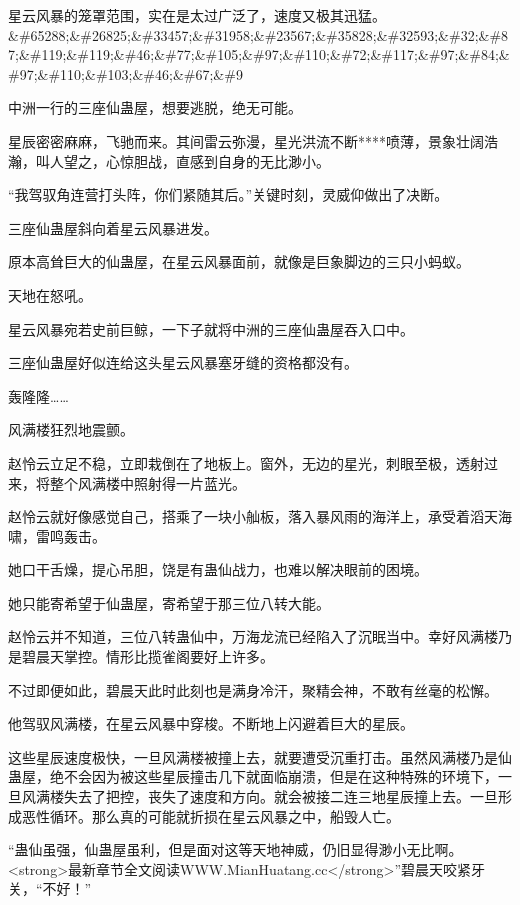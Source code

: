 
\begin{this_body}

星云风暴的笼罩范围，实在是太过广泛了，速度又极其迅猛。\&\#65288;\&\#26825;\&\#33457;\&\#31958;\&\#23567;\&\#35828;\&\#32593;\&\#32;\&\#87;\&\#119;\&\#119;\&\#46;\&\#77;\&\#105;\&\#97;\&\#110;\&\#72;\&\#117;\&\#97;\&\#84;\&\#97;\&\#110;\&\#103;\&\#46;\&\#67;\&\#9

中洲一行的三座仙蛊屋，想要逃脱，绝无可能。

星辰密密麻麻，飞驰而来。其间雷云弥漫，星光洪流不断****喷薄，景象壮阔浩瀚，叫人望之，心惊胆战，直感到自身的无比渺小。

“我驾驭角连营打头阵，你们紧随其后。”关键时刻，灵威仰做出了决断。

三座仙蛊屋斜向着星云风暴进发。

原本高耸巨大的仙蛊屋，在星云风暴面前，就像是巨象脚边的三只小蚂蚁。

天地在怒吼。

星云风暴宛若史前巨鲸，一下子就将中洲的三座仙蛊屋吞入口中。

三座仙蛊屋好似连给这头星云风暴塞牙缝的资格都没有。

轰隆隆……

风满楼狂烈地震颤。

赵怜云立足不稳，立即栽倒在了地板上。窗外，无边的星光，刺眼至极，透射过来，将整个风满楼中照射得一片蓝光。

赵怜云就好像感觉自己，搭乘了一块小舢板，落入暴风雨的海洋上，承受着滔天海啸，雷鸣轰击。

她口干舌燥，提心吊胆，饶是有蛊仙战力，也难以解决眼前的困境。

她只能寄希望于仙蛊屋，寄希望于那三位八转大能。

赵怜云并不知道，三位八转蛊仙中，万海龙流已经陷入了沉眠当中。幸好风满楼乃是碧晨天掌控。情形比揽雀阁要好上许多。

不过即便如此，碧晨天此时此刻也是满身冷汗，聚精会神，不敢有丝毫的松懈。

他驾驭风满楼，在星云风暴中穿梭。不断地上闪避着巨大的星辰。

这些星辰速度极快，一旦风满楼被撞上去，就要遭受沉重打击。虽然风满楼乃是仙蛊屋，绝不会因为被这些星辰撞击几下就面临崩溃，但是在这种特殊的环境下，一旦风满楼失去了把控，丧失了速度和方向。就会被接二连三地星辰撞上去。一旦形成恶性循环。那么真的可能就折损在星云风暴之中，船毁人亡。

“蛊仙虽强，仙蛊屋虽利，但是面对这等天地神威，仍旧显得渺小无比啊。<strong>最新章节全文阅读WWW.MianHuatang.cc</strong>”碧晨天咬紧牙关，“不好！”


\end{this_body}
